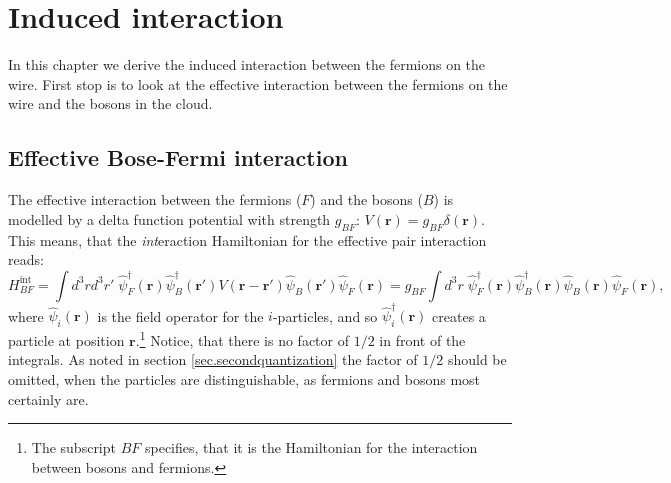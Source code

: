 
\chapter{Induced interaction} %

\label{Chapter3} %


In this chapter we derive the induced interaction between the fermions on the wire. First stop is to look at the effective interaction between the fermions on the wire and the bosons in the cloud.
\section{Effective Bose-Fermi interaction}
The effective interaction between the fermions ($F$) and the bosons ($B$) is modelled by a delta function potential with strength $g_{BF}$: $V(\mathbf{r})=g_{BF}\delta(\mathbf{r})$. This means, that the \textit{int}eraction Hamiltonian for the effective pair interaction reads:
\begin{equation}
H_{BF}^\text{int}  = \int d^3 r d^3 r' \; \hat{\psi}_F^\dagger(\mathbf{r}) \hat{\psi}_B^\dagger(\mathbf{r}')V(\mathbf{r}-\mathbf{r}')\hat{\psi}_B(\mathbf{r}')\hat{\psi}_F(\mathbf{r}) = g_{BF}\int d^3 r \; \hat{\psi}_F^\dagger(\mathbf{r}) \hat{\psi}_B^\dagger(\mathbf{r})\hat{\psi}_B(\mathbf{r})\hat{\psi}_F(\mathbf{r}),
\end{equation}
where $\hat{\psi}_i(\mathbf{r})$ is the field operator for the $i$-particles, and so $\hat{\psi}_i^\dagger(\mathbf{r})$ creates a particle at position $\mathbf{r}$.\footnote{The subscript $BF$ specifies, that it is the Hamiltonian for the interaction between bosons and fermions.} Notice, that there is no factor of $1/2$ in front of the integrals. As noted in section \ref{sec.secondquantization} the factor of $1/2$ should be omitted, when the particles are distinguishable, as fermions and bosons most certainly are. 

